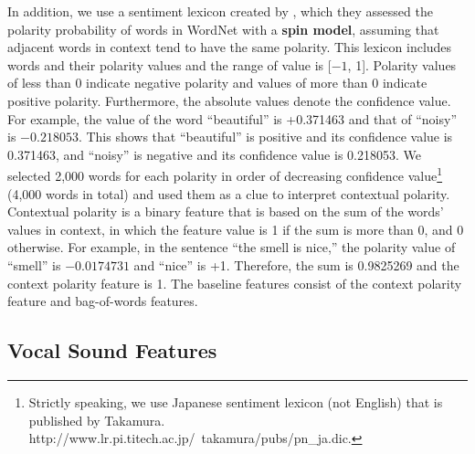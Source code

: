 \documentclass[english]{jnlp_1.4}
\begin{document}
In addition, we use a sentiment lexicon created by \cite{takamura2005}, which
they assessed the polarity probability of words in WordNet \cite{wordnet} with a {\bf spin model}, assuming that adjacent words in context tend to have the same polarity.
This lexicon includes words and their polarity values and the range of value is [$-1$, 1]. 
Polarity values of less than 0 indicate negative polarity and values of more than 0 indicate positive polarity.
Furthermore, the absolute values denote the confidence value.
For example, the value of the word ``beautiful'' is +0.371463 and that of ``noisy'' is $-0.218053$.
This shows that ``beautiful'' is positive and its confidence value is 0.371463,
and ``noisy'' is negative and its confidence value is 0.218053.
We selected 2,000 words for each polarity in order of decreasing confidence value\footnote{Strictly speaking, we use Japanese sentiment lexicon (not English) that is published by Takamura. http://www.lr.pi.titech.ac.jp/~takamura/pubs/pn\_ja.dic.} (4,000 words in total)
and used them as a clue to interpret contextual polarity.
Contextual polarity is a binary feature that is based on the sum of the words' values in context,
in which the feature value is 1 if the sum is more than 0, and 0 otherwise.
For example, in the sentence ``the smell is nice,'' the polarity value of ``smell'' is $-0.0174731$ and ``nice'' is +1.
Therefore, the sum is 0.9825269 and the context polarity feature is 1.
The baseline features consist of the context polarity feature and bag-of-words features.


\subsection{Vocal Sound Features}
\label{s:sound}
\end{document}
